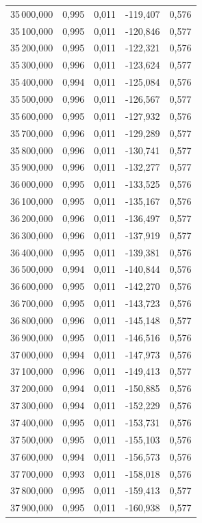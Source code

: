 \begin{longtable}{rrrrr}
35\,000,000 & 0,995 & 0,011 & -119,407 & 0,576\\
35\,100,000 & 0,995 & 0,011 & -120,846 & 0,577\\
35\,200,000 & 0,995 & 0,011 & -122,321 & 0,576\\
35\,300,000 & 0,996 & 0,011 & -123,624 & 0,577\\
35\,400,000 & 0,994 & 0,011 & -125,084 & 0,576\\
35\,500,000 & 0,996 & 0,011 & -126,567 & 0,577\\
35\,600,000 & 0,995 & 0,011 & -127,932 & 0,576\\
35\,700,000 & 0,996 & 0,011 & -129,289 & 0,577\\
35\,800,000 & 0,996 & 0,011 & -130,741 & 0,577\\
35\,900,000 & 0,996 & 0,011 & -132,277 & 0,577\\
36\,000,000 & 0,995 & 0,011 & -133,525 & 0,576\\
36\,100,000 & 0,995 & 0,011 & -135,167 & 0,576\\
36\,200,000 & 0,996 & 0,011 & -136,497 & 0,577\\
36\,300,000 & 0,996 & 0,011 & -137,919 & 0,577\\
36\,400,000 & 0,995 & 0,011 & -139,381 & 0,576\\
36\,500,000 & 0,994 & 0,011 & -140,844 & 0,576\\
36\,600,000 & 0,995 & 0,011 & -142,270 & 0,576\\
36\,700,000 & 0,995 & 0,011 & -143,723 & 0,576\\
36\,800,000 & 0,996 & 0,011 & -145,148 & 0,577\\
36\,900,000 & 0,995 & 0,011 & -146,516 & 0,576\\
37\,000,000 & 0,994 & 0,011 & -147,973 & 0,576\\
37\,100,000 & 0,996 & 0,011 & -149,413 & 0,577\\
37\,200,000 & 0,994 & 0,011 & -150,885 & 0,576\\
37\,300,000 & 0,994 & 0,011 & -152,229 & 0,576\\
37\,400,000 & 0,995 & 0,011 & -153,731 & 0,576\\
37\,500,000 & 0,995 & 0,011 & -155,103 & 0,576\\
37\,600,000 & 0,994 & 0,011 & -156,573 & 0,576\\
37\,700,000 & 0,993 & 0,011 & -158,018 & 0,576\\
37\,800,000 & 0,995 & 0,011 & -159,413 & 0,577\\
37\,900,000 & 0,995 & 0,011 & -160,938 & 0,577\\

\end{longtable}
